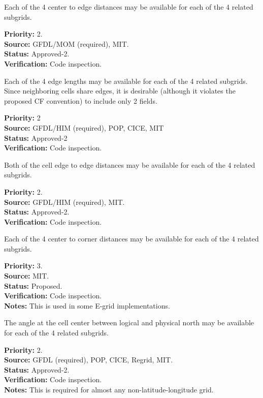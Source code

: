 Each of the 4 center to edge distances may be available for each of the 4 related
subgrids.
\begin{reqlist}
{\bf Priority:} 2. \\
{\bf Source:} GFDL/MOM (required), MIT. \\
{\bf Status:} Approved-2. \\
{\bf Verification:} Code inspection.
\end{reqlist}

Each of the 4 edge lengths may be available for each of the 4 related
subgrids.  Since neighboring cells share edges, it is desirable (although it violates
the proposed CF convention) to include only 2 fields.
\begin{reqlist}
{\bf Priority:} 2 \\
{\bf Source:} GFDL/HIM (required), POP, CICE, MIT \\
{\bf Status:} Approved-2 \\
{\bf Verification:} Code inspection.
\end{reqlist}

Both of the cell edge to edge distances may be available for each of the 4 related
subgrids.
\begin{reqlist}
{\bf Priority:} 2. \\
{\bf Source:} GFDL/HIM (required), MIT. \\
{\bf Status:} Approved-2. \\
{\bf Verification:} Code inspection. 
\end{reqlist}

Each of the 4 center to corner distances may be available for each of the 4
related subgrids.
\begin{reqlist}
{\bf Priority:} 3. \\
{\bf Source:} MIT. \\
{\bf Status:} Proposed. \\
{\bf Verification:} Code inspection. \\
{\bf Notes:} This is used in some E-grid implementations.
\end{reqlist}

The angle at the cell center between logical and physical north may be available
for each of the 4 related subgrids.
\begin{reqlist}
{\bf Priority:} 2. \\
{\bf Source:} GFDL (required), POP, CICE, Regrid, MIT. \\
{\bf Status:} Approved-2. \\
{\bf Verification:} Code inspection. \\
{\bf Notes:} This is required for almost any non-latitude-longitude grid.
\end{reqlist}

